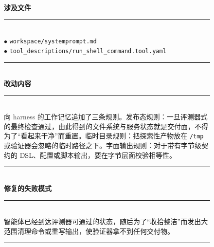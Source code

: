 \begin{figure}[t]
    \centering
    \scriptsize
    \begin{tcbraster}[raster columns=2,
                      raster equal height,
                      raster column skip=4pt,
                      raster row skip=0pt,
                      raster left skip=0pt,
                      raster right skip=0pt,
                      boxrule=0.6pt,
                      left=4pt,right=4pt,top=3pt,bottom=3pt,
                      coltitle=white]
        \begin{tcolorbox}[colback=aheSky!18,colframe=aheNavy,colbacktitle=aheNavy,
                          title={\scriptsize\textbf{chg-7，迭代 5，commit \texttt{3ba3a90}，层级：提示词 + 工具描述符}}]
            \textbf{\textcolor{aheNavy}{涉及文件}} \\
            \rule{\linewidth}{0.3pt}\\[1pt]
            $\bullet$ \texttt{workspace/systemprompt.md} \\
            $\bullet$ \texttt{tool\_descriptions/run\_shell\_command.tool.yaml} \\[3pt]
            \rule{\linewidth}{0.3pt}\\
            \textbf{\textcolor{aheNavy}{改动内容}} \\
            \rule{\linewidth}{0.3pt}\\[1pt]
            向 harness 的工作记忆追加了三条规则。发布态规则：一旦评测器式的最终检查通过，由此得到的文件系统与服务状态就是交付面，不得为了``看起来干净''而重置。临时目录规则：把探索性产物放在 \texttt{/tmp} 或验证器会忽略的临时路径之下。字面输出规则：对于带有字节级契约的 DSL、配置或脚本输出，要在字节层面校验相等性。 \\[3pt]
            \rule{\linewidth}{0.3pt}\\
            \textbf{\textcolor{aheNavy}{修复的失败模式}} \\
            \rule{\linewidth}{0.3pt}\\[1pt]
            智能体已经到达评测器可通过的状态，随后为了``收拾整洁''而发出大范围清理命令或重写输出，使验证器拿不到任何交付物。 \\[3pt]
            \rule{\linewidth}{0.3pt}\\

\end{tcolorbox}
\end{tcbraster}
\end{figure}
